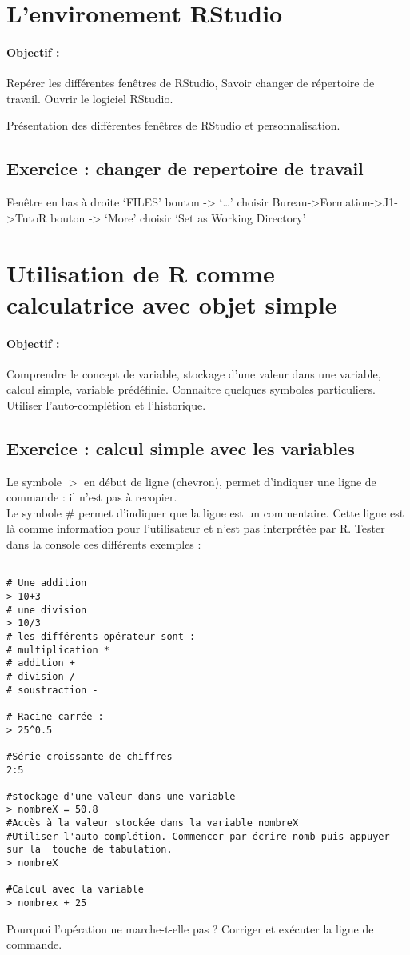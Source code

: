 \documentclass[a4paper]{article}
\begin{document}
\section{L'environement RStudio}

\paragraph{Objectif : } Repérer les différentes fenêtres de RStudio, Savoir changer de répertoire de travail.
Ouvrir le logiciel RStudio.

Présentation des différentes fenêtres de RStudio et personnalisation.

\subsection{Exercice : changer de repertoire de travail}

Fenêtre en bas à droite  ‘FILES' bouton  -> ‘…' choisir Bureau->Formation->J1->TutoR
                           bouton -> ‘More' choisir  ‘Set as Working Directory'

\section{Utilisation de R comme calculatrice avec objet simple}

\paragraph{Objectif : } Comprendre le concept de variable, stockage d'une valeur dans une variable, calcul simple, variable prédéfinie. Connaitre quelques symboles particuliers. Utiliser l'auto-complétion et l'historique.
\subsection{Exercice : calcul simple avec les variables}
Le symbole $>$ en début de ligne (chevron), permet d'indiquer une ligne de commande : il n'est pas à recopier. \\
Le symbole \# permet d'indiquer que la ligne est un commentaire. Cette ligne est là comme information pour l'utilisateur et n'est pas interprétée par R.
Tester dans la console ces différents exemples :
\begin{verbatim}

# Une addition 
> 10+3
# une division 
> 10/3
# les différents opérateur sont : 
# multiplication * 
# addition + 
# division / 
# soustraction -

# Racine carrée :
> 25^0.5

#Série croissante de chiffres
2:5

#stockage d'une valeur dans une variable
> nombreX = 50.8
#Accès à la valeur stockée dans la variable nombreX
#Utiliser l'auto-complétion. Commencer par écrire nomb puis appuyer sur la  touche de tabulation.
> nombreX

#Calcul avec la variable 				
> nombrex + 25
\end{verbatim}
Pourquoi l'opération ne marche-t-elle pas ? Corriger et exécuter la ligne de commande.
\end{document}
